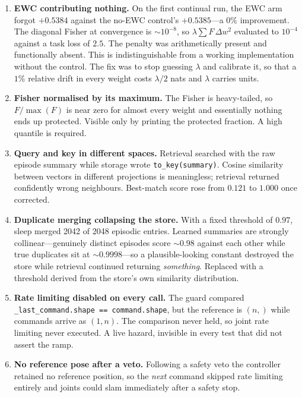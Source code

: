 \documentclass[10pt,twocolumn]{article}
\begin{document}
\begin{enumerate}\itemsep2pt

\item \textbf{EWC contributing nothing.} On the first continual run, the EWC
arm forgot $+0.5384$ against the no-EWC control's $+0.5385$---a $0\%$
improvement. The diagonal Fisher at convergence is $\sim\!10^{-8}$, so
$\lambda\sum F\,\Delta w^2$ evaluated to $10^{-4}$ against a task loss of
$2.5$. The penalty was arithmetically present and functionally absent. This is
indistinguishable from a working implementation without the control. The fix
was to stop guessing $\lambda$ and calibrate it, so that a $1\%$ relative drift
in every weight costs $\lambda/2$ nats and $\lambda$ carries units.

\item \textbf{Fisher normalised by its maximum.} The Fisher is heavy-tailed, so
$F/\max(F)$ is near zero for almost every weight and essentially nothing ends
up protected. Visible only by printing the protected fraction. A high quantile
is required.

\item \textbf{Query and key in different spaces.} Retrieval searched with the
raw episode summary while storage wrote \texttt{to\_key(summary)}. Cosine
similarity between vectors in different projections is meaningless; retrieval
returned confidently wrong neighbours. Best-match score rose from $0.121$ to
$1.000$ once corrected.

\item \textbf{Duplicate merging collapsing the store.} With a fixed threshold
of $0.97$, sleep merged 2042 of 2048 episodic entries. Learned summaries are
strongly collinear---genuinely distinct episodes score $\sim\!0.98$ against each
other while true duplicates sit at $\sim\!0.9998$---so a plausible-looking
constant destroyed the store while retrieval continued returning
\emph{something}. Replaced with a threshold derived from the store's own
similarity distribution.

\item \textbf{Rate limiting disabled on every call.} The guard compared
\texttt{\_last\_command.shape == command.shape}, but the reference is $(n,)$
while commands arrive as $(1,n)$. The comparison never held, so joint rate
limiting never executed. A live hazard, invisible in every test that did not
assert the ramp.

\item \textbf{No reference pose after a veto.} Following a safety veto the
controller retained no reference position, so the \emph{next} command skipped
rate limiting entirely and joints could slam immediately after a safety stop.


\end{enumerate}
\end{document}
